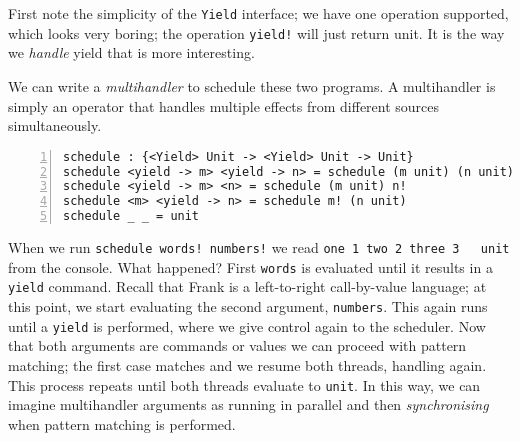 \documentclass[msc,deptreport,cs]{infthesis} %
\newcommand{\code}[1]{\lstinline{#1}}
\begin{document}
First note the simplicity of the \code{Yield} interface; we have one operation
supported, which looks very boring; the operation \code{yield!} will just return
unit. It is the way we \emph{handle} yield that is more interesting.

We can write a \emph{multihandler} to schedule these two programs. A
multihandler is simply an operator that handles multiple effects from different
sources simultaneously.

\begin{lstlisting}[numbers=left]
schedule : {<Yield> Unit -> <Yield> Unit -> Unit}
schedule <yield -> m> <yield -> n> = schedule (m unit) (n unit)
schedule <yield -> m> <n> = schedule (m unit) n!
schedule <m> <yield -> n> = schedule m! (n unit)
schedule _ _ = unit
\end{lstlisting}

When we run \code{schedule words! numbers!} we read \code{one 1 two 2 three 3
  unit} from the console. What happened? First \code{words} is evaluated until
it results in a \code{yield} command. Recall that Frank is a left-to-right
call-by-value language; at this point, we start evaluating the second argument,
\code{numbers}. This again runs until a \code{yield} is performed, where we give
control again to the scheduler. Now that both arguments are commands or values
we can proceed with pattern matching; the first case matches and we resume both
threads, handling again. This process repeats until both threads evaluate to
\code{unit}. In this way, we can imagine multihandler arguments as running in
parallel and then \emph{synchronising} when pattern matching is performed.


\end{document}
